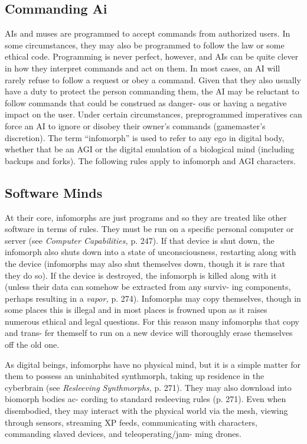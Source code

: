 \subsection{Commanding Ai}

AIs and muses are programmed to accept commands 
from authorized users. In some circumstances, they 
may also be programmed to follow the law or some 
ethical code. Programming is never perfect, however, 
and AIs can be quite clever in how they interpret 
commands and act on them. In most cases, an AI will 
rarely refuse to follow a request or obey a command. 
Given that they also usually have a duty to protect the 
person commanding them, the AI may be reluctant to 
follow commands that could be construed as danger-
ous or having a negative impact on the user. Under 
certain circumstances, preprogrammed imperatives 
can force an AI to ignore or disobey their owner's 
commands (gamemaster's discretion).
The term ``infomorph'' is used to refer to any ego in 
digital body, whether that be an AGI or the digital 
emulation of a biological mind (including backups 
and forks). The following rules apply to infomorph 
and AGI characters.

\subsection{Software Minds}

At their core, infomorphs are just programs and so 
they are treated like other software in terms of rules. 
They must be run on a specific personal computer or 
server (see \textit{Computer Capabilities,} p. 247). If that 
device is shut down, the infomorph also shuts down 
into a state of unconsciousness, restarting along with 
the device (infomorphs may also shut themselves 
down, though it is rare that they do so). If the device is 
destroyed, the infomorph is killed along with it (unless 
their data can somehow be extracted from any surviv-
ing components, perhaps resulting in a \textit{vapor,} p. 274). 
Infomorphs may copy themselves, though in some 
places this is illegal and in most places is frowned 
upon as it raises numerous ethical and legal questions. 
For this reason many infomorphs that copy and trans-
fer themself to run on a new device will thoroughly 
erase themselves off the old one.

As digital beings, infomorphs have no physical 
mind, but it is a simple matter for them to possess 
an uninhabited synthmorph, taking up residence in 
the cyberbrain (see \textit{Resleeving Synthmorphs,} p. 271). 
They may also download into biomorph bodies ac-
cording to standard resleeving rules (p. 271). Even 
when disembodied, they may interact with the 
physical world via the mesh, viewing through sensors, 
streaming XP feeds, communicating with characters, 
commanding slaved devices, and teleoperating/jam-
ming drones.

